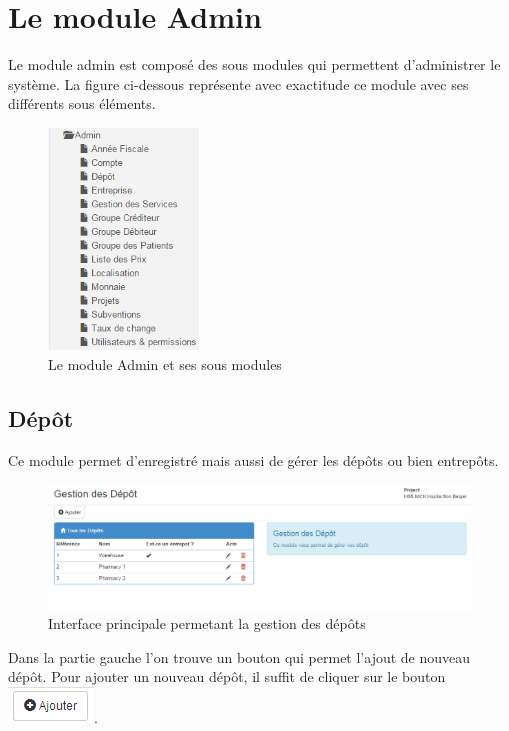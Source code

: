 \documentclass[12pt,a4paper]{report}
\begin{document}
\chapter{Le module Admin}        
Le module admin est composé des sous modules qui permettent d'administrer le système. La figure ci-dessous représente avec exactitude ce module avec ses différents sous éléments.
\begin{figure}[h]
\begin{center}
\includegraphics[width=4cm]{pic/s_admin.png}
\end{center}
\caption{Le module Admin et ses sous modules}
\label{Le module Admin et ses sous menus}
\end{figure} 

\section{Dépôt}
Ce module permet d'enregistré mais aussi de gérer les dépôts ou bien entrepôts.

\begin{figure}[h]
\begin{center}
\includegraphics[width=14cm]{pic/GestionDesDepot.png}
\end{center}
\caption{Interface principale permetant la gestion des dépôts}
\label{Interface principale permetant la gestion des dépôts}
\end{figure}

Dans la partie gauche l'on trouve un bouton qui permet l'ajout de nouveau dépôt. Pour ajouter un nouveau dépôt, il suffit de cliquer sur le bouton \includegraphics[scale=0.7]{pic/AddNewStore.png}.
\end{document}
